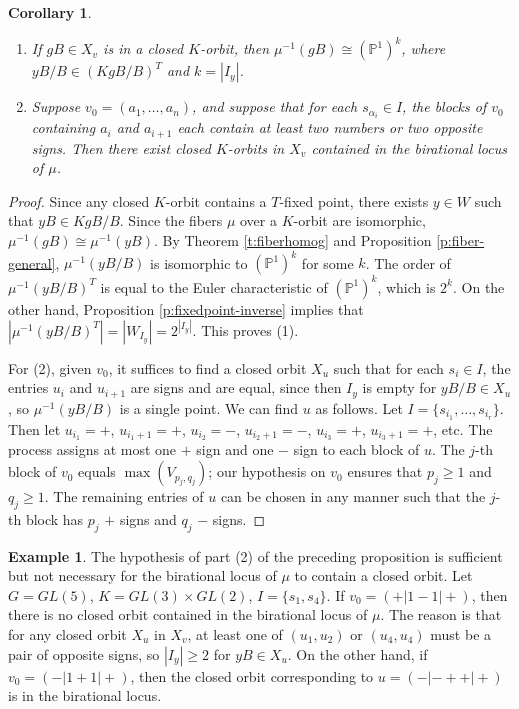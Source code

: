\documentclass[11pt,letterpaper,reqno]{amsart}
\newcommand{\ga}{\alpha}
\numberwithin{equation}{section}
\theoremstyle{plain}
\newtheorem{corollary}[theorem]{Corollary}
\theoremstyle{definition}
\newtheorem{example}[theorem]{Example}
\theoremstyle{remark}
\begin{document}
\begin{corollary} \label{c:inverseimage}
\begin{enumerate}
\item If $gB \in X_v$ is in a closed $K$-orbit, then $\mu^{-1}(gB) \cong (\mathbb{P}^1)^k$, where $yB/B \in (K gB/B)^T$
and $k = | I_y |$.
\item Suppose $v_0 = (a_1, \ldots, a_n)$, and suppose that for each $s_{\ga_i} \in I$, the
blocks of $v_0$ containing $a_i$ and $a_{i+1}$ each contain at least two numbers or two opposite signs.
Then there exist closed $K$-orbits in $X_v$ contained in the birational locus of $\mu$.
\end{enumerate}
\end{corollary}

\begin{proof}
Since any closed $K$-orbit contains a $T$-fixed point, there exists $y \in W$ such that $yB \in K gB/B$.  
Since the fibers $\mu$ over a $K$-orbit are isomorphic, $\mu^{-1}(gB) \cong \mu^{-1}(yB)$.
By Theorem \ref{t:fiberhomog} and Proposition \ref{p:fiber-general}, $\mu^{-1}(yB/B)$ is isomorphic to $(\mathbb{P}^1)^k$ for some $k$.
The order of $\mu^{-1}(yB/B)^T$ is equal to the Euler characteristic of $(\mathbb{P}^1)^k$, which is $2^k$.
On the other hand, Proposition \ref{p:fixedpoint-inverse} implies that $| \mu^{-1}(yB/B)^T | = | W_{I_y} | = 2^{| I_y |}$.  This proves (1).

For (2), given $v_0$, it suffices to find a closed orbit $X_u$ such that for each $s_{i} \in I$, the entries $u_i$ and $u_{i+1}$ are
signs and are equal, since then $I_y$ is empty for $yB/B \in X_u$, so $\mu^{-1}(yB/B)$ is a single point.  
We can find $u$ as follows.  Let $ I = \{ s_{{i_1}}, \ldots, s_{{i_r}} \}$.  Then let $u_{i_1} = +$, $u_{i_1+1} = +$,
$u_{i_2} = -$, $u_{i_2+1} = -$, $u_{i_3} = +$, $u_{i_3+1} = +$, etc.  The process assigns at most one $+$ sign and one $-$ sign to
each block of $u$.  The $j$-th block of $v_0$ equals $\max(V_{p_j, q_j})$; our hypothesis on
$v_0$ ensures that $p_j \geq 1$ and $q_j \geq 1$.
The remaining entries of $u$ can
be chosen in any manner such that the $j$-th block has $p_j$ $+$ signs and $q_j$ $-$ signs.
\end{proof}

\begin{example} \label{e:closed-birational}
The hypothesis of part (2) of the preceding proposition
is sufficient but not necessary for the birational locus of $\mu$ to contain a closed orbit.
Let $G = GL(5)$, $K = GL(3) \times GL(2)$, $I = \{s_{1}, s_{4} \}$.
If $v_0 = (+ | 1-1 | +)$, then there is no closed orbit contained in the birational locus of
$\mu$.  The reason is that for any closed orbit $X_u$ in $X_v$,
at least one of  $(u_1, u_2)$ or $(u_4, u_4)$ must be
a pair of opposite signs, so $| I_y | \geq 2$ for $yB \in X_u$.  On the other hand, if $v_0 = (- | 1+1 | +)$, then the closed
orbit corresponding to $u = (- | -++ | +)$ is in the birational locus.
\end{example}
\end{document}
